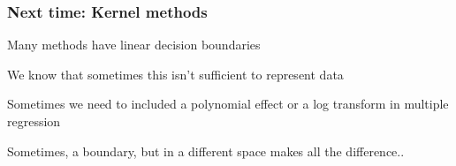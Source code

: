\documentclass[12pt]{beamer}
\begin{document}
%
%
%
%
%
%
%
%
%
%
%
%
%


\begin{frame}
\frametitle{Next time: Kernel methods}
Many methods have linear decision boundaries

\vsp
We know that sometimes this isn't sufficient to represent data

\vsp
{} Sometimes we need to included a polynomial effect or a log transform
in multiple regression

\vsp
Sometimes, a  boundary, but in a different space makes all the difference..
\vfill
\end{frame}
\end{document}
